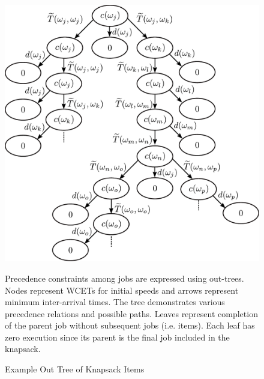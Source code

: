 \begin{figure}
    \centering
    \includegraphics[width=1.0\linewidth]{fig/vectorKnapsackTreeShortenedv5.pdf}
    \caption{Example Out Tree of Knapsack Items}Precedence constraints among jobs are expressed using out-trees. Nodes represent WCETs for initial speeds and arrows represent minimum inter-arrival times. The tree demonstrates various precedence relations and possible paths. Leaves represent completion of the parent job without subsequent jobs (i.e. items). Each leaf has zero execution since its parent is the final job included in the knapsack.
    \label{fig:KnapsackTree}
\end{figure}

